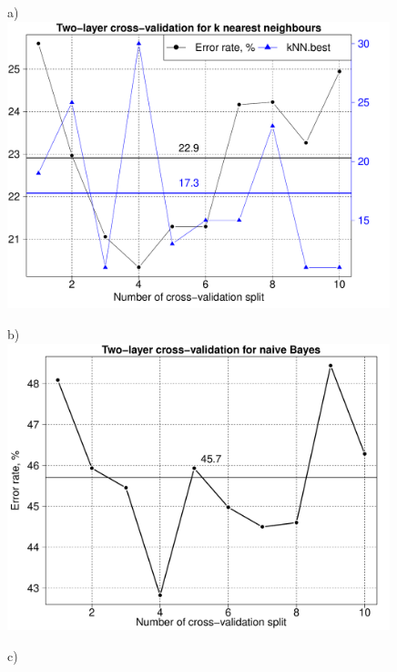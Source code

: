 \documentclass[10pt, paper=a4]{article}
\begin{document}
\begin{figure}[h!]
  \begin{minipage}{0.49\textwidth}
    a)\\
    \includegraphics[width = 0.99\textwidth]{k_nearest_neighbors_CV2.pdf}
  \end{minipage} \hfill
  \begin{minipage}{0.49\textwidth}
    b)\\
    \includegraphics[width = 0.99\textwidth]{naive_bayes_CV1.pdf}
  \end{minipage} \vfill
  \begin{minipage}{0.49\textwidth}
    c)\\

\end{minipage}
\end{figure}
\end{document}
